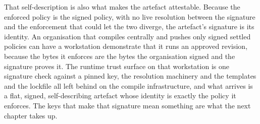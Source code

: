 That self-description is also what makes the artefact attestable.
Because the enforced policy is the signed policy, with no live
resolution between the signature and the enforcement that could let the
two diverge, the artefact's signature is its identity. An organisation
that compiles centrally and pushes only signed settled policies can have
a workstation demonstrate that it runs an approved revision, because the
bytes it enforces are the bytes the organisation signed and the
signature proves it. The runtime trust surface on that workstation is
one signature check against a pinned key, the resolution machinery and
the templates and the lockfile all left behind on the compile
infrastructure, and what arrives is a flat, signed, self-describing
artefact whose identity is exactly the policy it enforces. The keys that
make that signature mean something are what the next chapter takes up.
